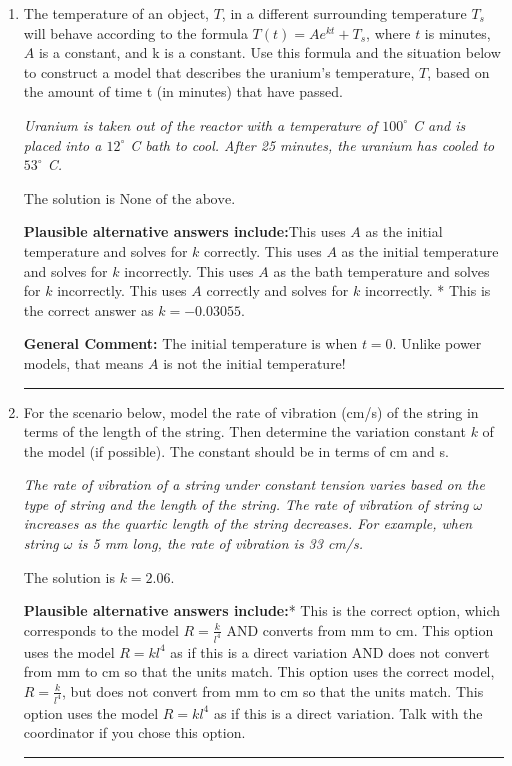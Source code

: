 \documentclass{extbook}[14pt]
\newcommand{\litem}[1]{\item #1

\rule{\textwidth}{0.4pt}}
\begin{document}
\begin{enumerate}\litem{
The temperature of an object, $T$, in a different surrounding temperature $T_s$ will behave according to the formula $T(t) = Ae^{kt} + T_s$, where $t$ is minutes, $A$ is a constant, and k is a constant. Use this formula and the situation below to construct a model that describes the uranium's temperature, $T$, based on the amount of time t (in minutes) that have passed.

\begin{center}
    \textit{ Uranium is taken out of the reactor with a temperature of $100^{\circ}$ C and is placed into a $12^{\circ}$ C bath to cool. After 25 minutes, the uranium has cooled to $53^{\circ}$ C. }
\end{center}
The solution is \( \text{None of the above} \).\begin{enumerate}[label=\Alph*.]
\textbf{Plausible alternative answers include:}This uses $A$ as the initial temperature and solves for $k$ correctly.
This uses $A$ as the initial temperature and solves for $k$ incorrectly.
This uses $A$ as the bath temperature and solves for $k$ incorrectly.
This uses $A$ correctly and solves for $k$ incorrectly.
* This is the correct answer as $k = -0.03055$.
\end{enumerate}

\textbf{General Comment:} The initial temperature is when $t = 0$. Unlike power models, that means $A$ is not the initial temperature!
}
\litem{
For the scenario below, model the rate of vibration (cm/s) of the string in terms of the length of the string. Then determine the variation constant $k$ of the model (if possible). The constant should be in terms of cm and s.

\begin{center}
    \textit{ The rate of vibration of a string under constant tension varies based on the type of string and the length of the string. The rate of vibration of string $\omega$ increases as the quartic length of the string decreases. For example, when string $\omega$ is 5 mm long, the rate of vibration is 33 cm/s. }
\end{center}
The solution is \( k = 2.06 \).\begin{enumerate}[label=\Alph*.]
\textbf{Plausible alternative answers include:}* This is the correct option, which corresponds to the model $R = \frac{k}{l^{4}}$ AND converts from mm to cm.
This option uses the model $R = kl^{4}$ as if this is a direct variation AND does not convert from mm to cm so that the units match.
This option uses the correct model, $R = \frac{k}{l^{4}}$, but does not convert from mm to cm so that the units match.
This option uses the model $R = kl^{4}$ as if this is a direct variation.
Talk with the coordinator if you chose this option.
\end{enumerate}

}
\end{enumerate}
\end{document}
